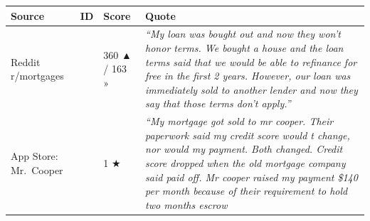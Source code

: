 \documentclass[
  10pt,
]{article}
\let\origtexttt\texttt
\renewcommand{\texttt}[1]{\origtexttt{\seqsplit{#1}}}
\begin{document}
\begin{longtable}[]{@{}llll@{}}
\toprule
\begin{minipage}[b]{0.20\columnwidth}\raggedright
Source\strut
\end{minipage} & \begin{minipage}[b]{0.14\columnwidth}\raggedright
ID\strut
\end{minipage} & \begin{minipage}[b]{0.10\columnwidth}\raggedright
Score\strut
\end{minipage} & \begin{minipage}[b]{0.44\columnwidth}\raggedright
Quote\strut
\end{minipage}\tabularnewline
\midrule
\endhead
\begin{minipage}[t]{0.20\columnwidth}\raggedright
Reddit r/mortgages\strut
\end{minipage} & \begin{minipage}[t]{0.14\columnwidth}\raggedright
\texttt{1kdy5q8}\strut
\end{minipage} & \begin{minipage}[t]{0.10\columnwidth}\raggedright
360 ▲ / 163 »\strut
\end{minipage} & \begin{minipage}[t]{0.44\columnwidth}\raggedright
\emph{``My loan was bought out and now they won't honor terms. We bought a house and the loan terms
said that we would be able to refinance for free in the first 2 years. However, our loan was
immediately sold to another lender and now they say that those terms don't apply.''}\strut
\end{minipage}\tabularnewline
\begin{minipage}[t]{0.20\columnwidth}\raggedright
App Store: Mr.~Cooper\strut
\end{minipage} & \begin{minipage}[t]{0.14\columnwidth}\raggedright
\texttt{appstore\_1114621467\_12642269853}\strut
\end{minipage} & \begin{minipage}[t]{0.10\columnwidth}\raggedright
1 ★\strut
\end{minipage} & \begin{minipage}[t]{0.44\columnwidth}\raggedright
\emph{``My mortgage got sold to mr cooper. Their paperwork said my credit score would t change, nor
would my payment. Both changed. Credit score dropped when the old mortgage company said paid off. Mr
cooper raised my payment \$140 per month because of their requirement to hold two months escrow
}
\end{minipage}
\end{longtable}
\end{document}
